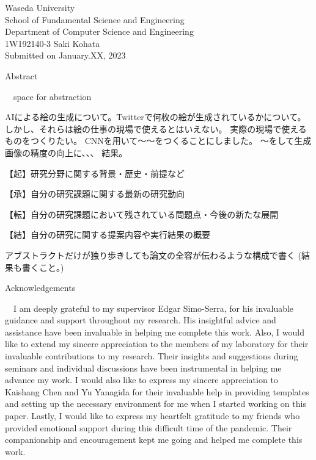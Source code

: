 \documentclass[a4paper, oneside, uplatex, 12pt]{book}
\begin{document}
\begin{titlepage}
\begin{center}
    \vspace{0.05\textheight}
    {\Large 
        Waseda University \\
        School of Fundamental Science and Engineering \\
        Department of Computer Science and Engineering \\}
    \vspace{0.05\textheight}
    {\Large 1W192140-3 Saki Kohata \\}
    \vspace{0.05\textheight}
    {Submitted on January.XX, 2023}
\end{center}
\end{titlepage}
    

\pagebreak
\hspace{0pt}
\vfill %
    \begin{center}
    Abstract
    \end{center}
　space for abstraction

AIによる絵の生成について。Twitterで何枚の絵が生成されているかについて。
しかし、それらは絵の仕事の現場で使えるとはいえない。
実際の現場で使えるものをつくりたい。
CNNを用いて～～をつくることにしました。
～をして生成画像の精度の向上に、、、
結果。

【起】研究分野に関する背景・歴史・前提など

【承】自分の研究課題に関する最新の研究動向

【転】自分の研究課題において残されている問題点・今後の新たな展開

【結】自分の研究に関する提案内容や実行結果の概要

アブストラクトだけが独り歩きしても論文の全容が伝わるような構成で書く
(結果も書くこと。)

\vfill
\pagebreak

\pagebreak
\hspace{0pt}
\vfill 
    \begin{center}
    Acknowledgements
    \end{center}
    　I am deeply grateful to my supervisor Edgar Simo-Serra, for his invaluable 
    guidance and support throughout my research. His insightful advice and assistance 
    have been invaluable in helping me complete this work.
    Also, I would like to extend my sincere appreciation to the members of my laboratory
    for their invaluable contributions to my research. Their insights and suggestions 
    during seminars and individual discussions have been instrumental in helping me 
    advance my work.
    I would also like to express my sincere appreciation to Kaishang Chen and  Yu Yanagida 
    for their invaluable help in providing templates and setting up the necessary 
    environment for me when I started working on this paper. 
    Lastly, I would like to express my heartfelt gratitude to my friends who provided 
    emotional support during this difficult time of the pandemic. Their companionship 
    and encouragement kept me going and helped me complete this work. 
\end{document}

